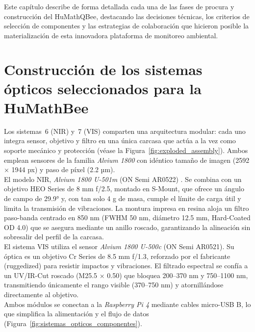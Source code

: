 \noindent Este capítulo describe de forma detallada cada una de las fases de procura y construcción del HuMath\textregistered QBee, destacando las decisiones técnicas, los criterios de selección de componentes y las estrategias de colaboración que hicieron posible la materialización de esta innovadora plataforma de monitoreo ambiental.\\



\section{Construcción de los sistemas ópticos seleccionados para la HuMath\textregistered Bee}

\noindent Los sistemas~6 (NIR) y~7 (VIS) comparten una arquitectura modular: cada uno integra sensor, objetivo y filtro en una única carcasa que actúa a la vez como soporte mecánico y protección (véase la Figura~\ref{fig:exploded_assembly}). Ambos emplean sensores de la familia \textit{Alvium 1800} con idéntico tamaño de imagen (2592 × 1944 px) y paso de píxel (2.2 µm). \\

\noindent El modelo NIR, \textit{Alvium 1800 U-501m} (ON Semi AR0522) \cite{alliedvision_alvium1800U_501NIRm}. Se combina con un objetivo HEO Series de 8 mm f/2.5, montado en S-Mount, que ofrece un ángulo de campo de 29.9° y, con tan solo 4 g de masa, cumple el límite de carga útil y limita la transmisión de vibraciones. La montura impresa en resina aloja un filtro paso-banda centrado en 850 nm (FWHM 50 nm, diámetro 12.5 mm, Hard-Coated OD 4.0) que se asegura mediante un anillo roscado, garantizando la alineación sin sobresalir del perfil de la carcasa.\\


\noindent El sistema VIS utiliza el sensor \textit{Alvium 1800 U-500c} (ON Semi AR0521). Su óptica es un objetivo Cr Series de 8.5 mm f/1.3, reforzado por el fabricante (ruggedized) para resistir impactos y vibraciones. El filtrado espectral se confía a un UV/IR-Cut roscado (M25.5 × 0.50) que bloquea 200–370 nm y 750–1100 nm, transmitiendo únicamente el rango visible (370–750 nm) y atornillándose directamente al objetivo.\\

\noindent Ambos módulos se conectan a la \textit{Raspberry Pi 4} mediante cables micro-USB B, lo que simplifica la alimentación y el flujo de datos (Figura~\ref{fig:sistemas_opticos_componentes}).


